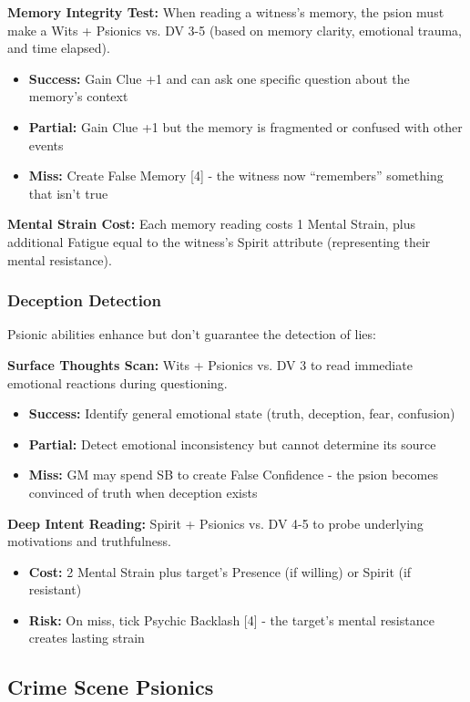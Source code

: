 \documentclass[11pt,twoside]{article}
\begin{document}
\textbf{Memory Integrity Test:} When reading a witness's memory, the psion must make a Wits + Psionics vs. DV 3-5 (based on memory clarity, emotional trauma, and time elapsed). 
\begin{itemize}
    \item \textbf{Success:} Gain Clue +1 and can ask one specific question about the memory's context
    \item \textbf{Partial:} Gain Clue +1 but the memory is fragmented or confused with other events
    \item \textbf{Miss:} Create False Memory [4] - the witness now ``remembers'' something that isn't true
\end{itemize}

\textbf{Mental Strain Cost:} Each memory reading costs 1 Mental Strain, plus additional Fatigue equal to the witness's Spirit attribute (representing their mental resistance).

\subsubsection{Deception Detection}
Psionic abilities enhance but don't guarantee the detection of lies:

\textbf{Surface Thoughts Scan:} Wits + Psionics vs. DV 3 to read immediate emotional reactions during questioning.
\begin{itemize}
    \item \textbf{Success:} Identify general emotional state (truth, deception, fear, confusion)
    \item \textbf{Partial:} Detect emotional inconsistency but cannot determine its source
    \item \textbf{Miss:} GM may spend SB to create False Confidence - the psion becomes convinced of truth when deception exists
\end{itemize}

\textbf{Deep Intent Reading:} Spirit + Psionics vs. DV 4-5 to probe underlying motivations and truthfulness.
\begin{itemize}
    \item \textbf{Cost:} 2 Mental Strain plus target's Presence (if willing) or Spirit (if resistant)
    \item \textbf{Risk:} On miss, tick Psychic Backlash [4] - the target's mental resistance creates lasting strain
\end{itemize}

\subsection{Crime Scene Psionics}
\end{document}
